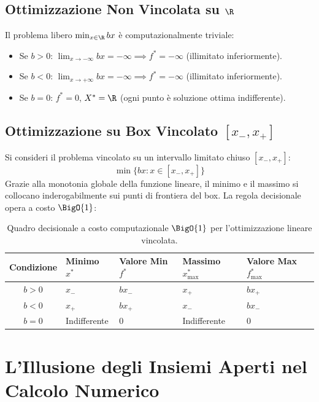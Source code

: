 \subsection[Ottimizzazione Non Vincolata su R]{Ottimizzazione Non Vincolata su $\R$}
Il problema libero $\min_{x \in \R} bx$ \`e computazionalmente triviale:
\begin{itemize}
    \item Se $b > 0$: $\lim_{x \to -\infty} bx = -\infty \implies f^* = -\infty$ (illimitato inferiormente).
    \item Se $b < 0$: $\lim_{x \to +\infty} bx = -\infty \implies f^* = -\infty$ (illimitato inferiormente).
    \item Se $b = 0$: $f^* = 0$, $X^* = \R$ (ogni punto \`e soluzione ottima indifferente).
\end{itemize}

\subsection[Ottimizzazione su Box Vincolato]{Ottimizzazione su Box Vincolato $[x_-, x_+]$}
Si consideri il problema vincolato su un intervallo limitato chiuso $[x_-, x_+]$:
\begin{equation}
\min \{ bx : x \in [x_-, x_+] \}
\end{equation}
Grazie alla monotonia globale della funzione lineare, il minimo e il massimo si collocano inderogabilmente sui punti di frontiera del box. La regola decisionale opera a costo $\BigO{1}$:

\begin{table}[H]
\centering
\small
\renewcommand{\arraystretch}{1.3}
\begin{tabularx}{\textwidth}{c Y Y Y Y}
\toprule
\textbf{Condizione} & \textbf{Minimo $x^*$} & \textbf{Valore Min $f^*$} & \textbf{Massimo $x^*_{\max}$} & \textbf{Valore Max $f^*_{\max}$} \\
\midrule
$b > 0$ & $x_-$ & $b x_-$ & $x_+$ & $b x_+$ \\
$b < 0$ & $x_+$ & $b x_+$ & $x_-$ & $b x_-$ \\
$b = 0$ & Indifferente & $0$ & Indifferente & $0$ \\
\bottomrule
\end{tabularx}
\caption{Quadro decisionale a costo computazionale $\BigO{1}$ per l'ottimizzazione lineare vincolata.}
\label{tab:lineare-box}
\end{table}


\FloatBarrier
\section{L'Illusione degli Insiemi Aperti nel Calcolo Numerico}
\label{sec:opt-insiemi-aperti}

